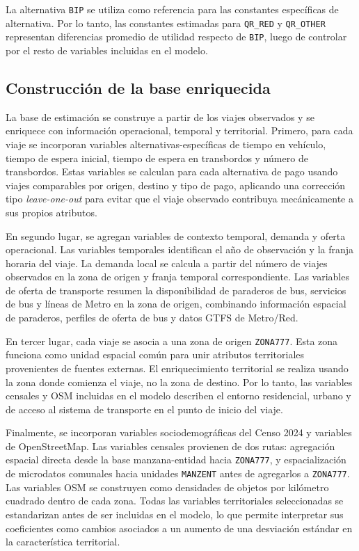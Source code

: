 La alternativa \texttt{BIP} se utiliza como referencia para las constantes específicas de alternativa. Por lo tanto, las constantes estimadas para \texttt{QR\_RED} y \texttt{QR\_OTHER} representan diferencias promedio de utilidad respecto de \texttt{BIP}, luego de controlar por el resto de variables incluidas en el modelo.

\subsection{Construcción de la base enriquecida}

La base de estimación se construye a partir de los viajes observados y se enriquece con información operacional, temporal y territorial. Primero, para cada viaje se incorporan variables alternativas-específicas de tiempo en vehículo, tiempo de espera inicial, tiempo de espera en transbordos y número de transbordos. Estas variables se calculan para cada alternativa de pago usando viajes comparables por origen, destino y tipo de pago, aplicando una corrección tipo \textit{leave-one-out} para evitar que el viaje observado contribuya mecánicamente a sus propios atributos.

En segundo lugar, se agregan variables de contexto temporal, demanda y oferta operacional. Las variables temporales identifican el año de observación y la franja horaria del viaje. La demanda local se calcula a partir del número de viajes observados en la zona de origen y franja temporal correspondiente. Las variables de oferta de transporte resumen la disponibilidad de paraderos de bus, servicios de bus y líneas de Metro en la zona de origen, combinando información espacial de paraderos, perfiles de oferta de bus y datos GTFS de Metro/Red.

En tercer lugar, cada viaje se asocia a una zona de origen \texttt{ZONA777}. Esta zona funciona como unidad espacial común para unir atributos territoriales provenientes de fuentes externas. El enriquecimiento territorial se realiza usando la zona donde comienza el viaje, no la zona de destino. Por lo tanto, las variables censales y OSM incluidas en el modelo describen el entorno residencial, urbano y de acceso al sistema de transporte en el punto de inicio del viaje.

Finalmente, se incorporan variables sociodemográficas del Censo 2024 y variables de OpenStreetMap. Las variables censales provienen de dos rutas: agregación espacial directa desde la base manzana-entidad hacia \texttt{ZONA777}, y espacialización de microdatos comunales hacia unidades \texttt{MANZENT} antes de agregarlos a \texttt{ZONA777}. Las variables OSM se construyen como densidades de objetos por kilómetro cuadrado dentro de cada zona. Todas las variables territoriales seleccionadas se estandarizan antes de ser incluidas en el modelo, lo que permite interpretar sus coeficientes como cambios asociados a un aumento de una desviación estándar en la característica territorial.

